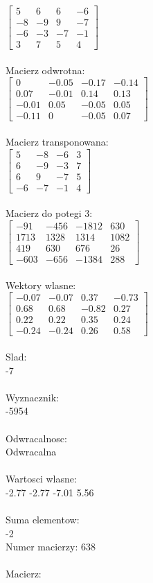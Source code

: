 \documentclass[a4paper,12pt]{article}
\begin{document}
$\begin{bmatrix} 5&6&6&-6\\-8&-9&9&-7\\-6&-3&-7&-1\\3&7&5&4 \end{bmatrix}$
\\
\\
Macierz odwrotna:\\

$\begin{bmatrix} 0&-0.05&-0.17&-0.14\\0.07&-0.01&0.14&0.13\\-0.01&0.05&-0.05&0.05\\-0.11&0&-0.05&0.07 \end{bmatrix}$
\\
\\
Macierz transponowana:\\

$\begin{bmatrix} 5&-8&-6&3\\6&-9&-3&7\\6&9&-7&5\\-6&-7&-1&4 \end{bmatrix}$
\\
\\
Macierz do potegi 3:\\

$\begin{bmatrix} -91&-456&-1812&630\\1713&1328&1314&1082\\419&630&676&26\\-603&-656&-1384&288 \end{bmatrix}$
\\
\\
Wektory wlasne:\\

$\begin{bmatrix} -0.07&-0.07&0.37&-0.73\\0.68&0.68&-0.82&0.27\\0.22&0.22&0.35&0.24\\-0.24&-0.24&0.26&0.58 \end{bmatrix}$
\\
\\
Slad:\\
-7
\\
\\
Wyznacznik:\\
-5954
\\
\\
Odwracalnosc:\\
Odwracalna
\\
\\
Wartosci wlasne:\\
-2.77 -2.77 -7.01 5.56
\\
\\
Suma elementow:\\
-2
\\
\newpage
Numer macierzy:
638
\\
\\
Macierz:\\
\end{document}
